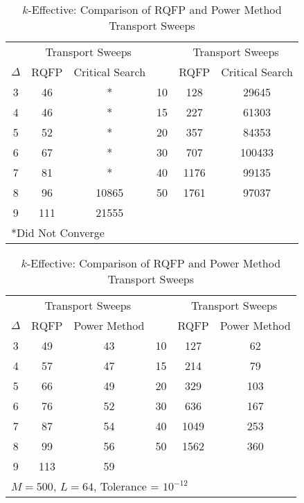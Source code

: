 \begin{table}[!htbp]
	\caption{Transport Sweep Comparisons for Homogeneous Multiplying Spheres}
	\begin{subtable}[h]{1.0\textwidth}
	\centering{}
	\begin{tabular}{@{}cccccc@{}}\toprule
	& \multicolumn{2}{c}{Transport Sweeps} & & \multicolumn{2}{c}{Transport Sweeps} \\
	\cmidrule{2-3} \cmidrule{5-6} $\Delta$ & RQFP & Critical Search \quad &  \Delta & RQFP & Critical Search\\
	\midrule
3 & 46 & * & 10 & 128 & 29645 \\
4 & 46 & * & 15 & 227 & 61303 \\
5 & 52 & * & 20 & 357 & 84353 \\
6 & 67 & * & 30 & 707 & 100433 \\
7 & 81 & * & 40 & 1176 & 99135 \\
8 & 96 & 10865 & 50 & 1761 & 97037 \\
9 & 111 & 21555 & & & \\ 
	\bottomrule
	\multicolumn{6}{l}{*Did Not Converge} \\
	\end{tabular}
	\caption{Alpha-Eigenvalue: Comparison of RQFP and Critical Search Sweeps}
	\label{table:CompMultSweepsSphere}
	\end{subtable}%
	\vspace{0.25cm}
	\begin{subtable}[h]{1.0\textwidth}
	\centering{}
	\begin{tabular}{@{}cccccc@{}}\toprule
	& \multicolumn{2}{c}{Transport Sweeps} & & \multicolumn{2}{c}{Transport Sweeps} \\
	\cmidrule{2-3} \cmidrule{5-6} $\Delta$ & RQFP & Power Method \quad &  \Delta & RQFP & Power Method\\
	\midrule
3 & 49 & 43 & 10 & 127 & 62 \\ 
4 & 57 & 47 & 15 & 214 & 79 \\
5 & 66 & 49 & 20 & 329 & 103 \\
6 & 76 & 52 & 30 & 636 & 167 \\ 
7 & 87 & 54 & 40 & 1049 & 253 \\ 
8 & 99 & 56 & 50 & 1562 & 360 \\ 
9 & 113 & 59 &  &  &  \\ 
	\bottomrule
	\multicolumn{6}{l}{$M = 500$, $L = 64$, Tolerance = $10^{-12}$} \\
	\end{tabular}
	\caption{$k$-Effective: Comparison of RQFP and Power Method Transport Sweeps}
	\label{table:CompMultSweepsKSphere}
	\end{subtable}
\end{table}

